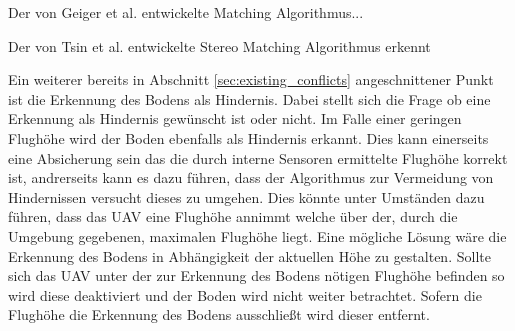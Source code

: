 Der von Geiger et al. \cite{geiger2011efficient} entwickelte Matching Algorithmus...

Der von Tsin et al. \cite{tsin2003stereo} entwickelte Stereo Matching Algorithmus erkennt 

\noindent
Ein weiterer bereits in Abschnitt \ref{sec:existing_conflicts} angeschnittener Punkt ist die Erkennung des Bodens als Hindernis. Dabei stellt sich die Frage ob eine Erkennung als Hindernis gewünscht ist oder nicht. Im Falle einer geringen Flughöhe wird der Boden ebenfalls als Hindernis erkannt. Dies kann einerseits eine Absicherung sein das die durch interne Sensoren ermittelte Flughöhe korrekt ist, andrerseits kann es dazu führen, dass der Algorithmus zur Vermeidung von Hindernissen versucht dieses zu  umgehen. Dies könnte unter Umständen dazu führen, dass das UAV eine Flughöhe annimmt welche über der, durch die Umgebung gegebenen, maximalen Flughöhe liegt. Eine mögliche Lösung wäre die Erkennung des Bodens in Abhängigkeit der aktuellen Höhe zu gestalten. Sollte sich das UAV unter der zur Erkennung des Bodens nötigen Flughöhe befinden so wird diese deaktiviert und der Boden wird nicht weiter betrachtet. Sofern die Flughöhe die Erkennung des Bodens ausschließt wird dieser entfernt.
